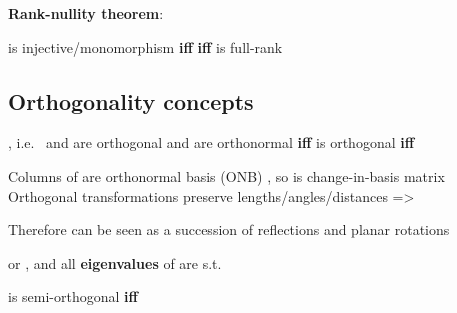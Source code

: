 \textbf{Rank-nullity theorem}:

 is injective/monomorphism \textbf{iff}
 \textbf{iff}  is full-rank

\subsection*{Orthogonality concepts}

\begin{itemize}

      \vItem
            , i.e.~ and  are
            orthogonal
      \vItem
             and  are orthonormal \textbf{iff}
      \vItem
             is orthogonal \textbf{iff}

            \begin{itemize}

                  \vItem
                        Columns of  are
                        orthonormal basis (ONB)
                        ,
                        so  is change-in-basis matrix
                  \vItem
                        Orthogonal transformations preserve lengths/angles/distances
                        =>

                        \begin{itemize}

                              \vItem
                                    Therefore can be seen as a succession of reflections and planar
                                    rotations
                        \end{itemize}
                  \vItem
                         or , and all
                        \textbf{eigenvalues} of  are s.t.
            \end{itemize}
      \vItem
             is semi-orthogonal \textbf{iff}


\end{itemize}
